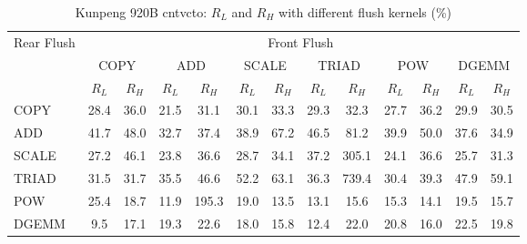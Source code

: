 \begin{table}[htbp]
\centering
\caption{Kunpeng 920B cntvcto: $R_L$ and $R_H$ with different flush kernels (\%)}
\label{tab:frkern-c920bn3-cntvcto}
\begin{tabular*}{\textwidth}{@{\extracolsep{\fill}}lcccccccccccc}
\toprule
\multirow{3}{*}{Rear Flush} & \multicolumn{12}{c}{Front Flush} \\ \cmidrule(lr){2-13}
& \multicolumn{2}{c}{COPY} & \multicolumn{2}{c}{ADD} & \multicolumn{2}{c}{SCALE} & \multicolumn{2}{c}{TRIAD} & \multicolumn{2}{c}{POW} & \multicolumn{2}{c}{DGEMM} \\ \cmidrule(lr){2-3} \cmidrule(lr){4-5} \cmidrule(lr){6-7} \cmidrule(lr){8-9} \cmidrule(lr){10-11} \cmidrule(lr){12-13}
& $R_L$ & $R_H$ & $R_L$ & $R_H$ & $R_L$ & $R_H$ & $R_L$ & $R_H$ & $R_L$ & $R_H$ & $R_L$ & $R_H$ \\ \midrule
COPY & 28.4 & 36.0 & 21.5 & 31.1 & 30.1 & 33.3 & 29.3 & 32.3 & 27.7 & 36.2 & 29.9 & 30.5 \\
ADD & 41.7 & 48.0 & 32.7 & 37.4 & 38.9 & 67.2 & 46.5 & 81.2 & 39.9 & 50.0 & 37.6 & 34.9 \\
SCALE & 27.2 & 46.1 & 23.8 & 36.6 & 28.7 & 34.1 & 37.2 & 305.1 & 24.1 & 36.6 & 25.7 & 31.3 \\
TRIAD & 31.5 & 31.7 & 35.5 & 46.6 & 52.2 & 63.1 & 36.3 & 739.4 & 30.4 & 39.3 & 47.9 & 59.1 \\
POW & 25.4 & 18.7 & 11.9 & 195.3 & 19.0 & 13.5 & 13.1 & 15.6 & 15.3 & 14.1 & 19.5 & 15.7 \\
DGEMM & 9.5 & 17.1 & 19.3 & 22.6 & 18.0 & 15.8 & 12.4 & 22.0 & 20.8 & 16.0 & 22.5 & 19.8 \\
\bottomrule
\end{tabular*}
\end{table}